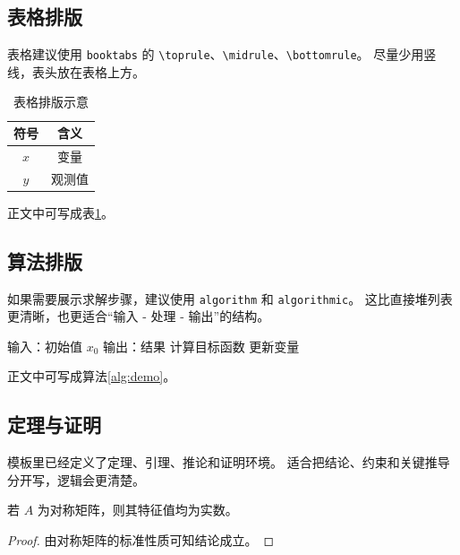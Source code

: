 \subsection{表格排版}
表格建议使用 \texttt{booktabs} 的 \texttt{\textbackslash toprule}、\texttt{\textbackslash midrule}、\texttt{\textbackslash bottomrule}。
尽量少用竖线，表头放在表格上方。

\begin{table}[H]
    \centering
    \caption{表格排版示意}
    \label{tab:layout}
    \begin{tabular}{cc}
        \toprule
        符号 & 含义 \\
        \midrule
        $x$ & 变量 \\
        $y$ & 观测值 \\
        \bottomrule
    \end{tabular}
\end{table}

正文中可写成表\cref{tab:layout}。

\subsection{算法排版}
如果需要展示求解步骤，建议使用 \texttt{algorithm} 和 \texttt{algorithmic}。
这比直接堆列表更清晰，也更适合“输入 - 处理 - 输出”的结构。

\begin{algorithm}[H]
\caption{示意算法}
\label{alg:demo}
\begin{algorithmic}
\STATE 输入：初始值 $x_0$
\STATE 输出：结果
\STATE 计算目标函数
    \STATE 更新变量
\ENDWHILE

\end{algorithmic}
\end{algorithm}

正文中可写成算法\cref{alg:demo}。

\subsection{定理与证明}
模板里已经定义了定理、引理、推论和证明环境。
适合把结论、约束和关键推导分开写，逻辑会更清楚。

\begin{theorem}
若 $A$ 为对称矩阵，则其特征值均为实数。
\end{theorem}

\begin{proof}
由对称矩阵的标准性质可知结论成立。
\end{proof}

